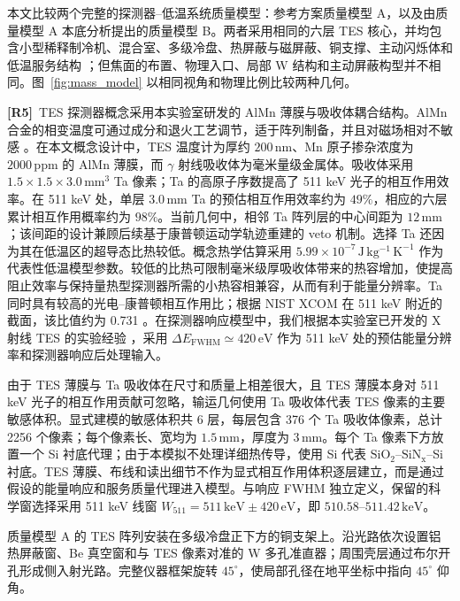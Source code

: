 \documentclass[11pt]{article}
\newcommand{\revmark}[1]{\textcolor{revisionblue}{\textbf{[R#1]}}\ }
\begin{document}
本文比较两个完整的探测器--低温系统质量模型：参考方案质量模型 A，以及由质量模型 A 本底分析提出的质量模型 B。两者采用相同的六层 TES 核心，并均包含小型稀释制冷机、混合室、多级冷盘、热屏蔽与磁屏蔽、铜支撑、主动闪烁体和低温服务结构 \cite{Shirazi2023,Gottardi2021TESReview}；但焦面的布置、物理入口、局部 W 结构和主动屏蔽构型并不相同。图~\ref{fig:mass_model} 以相同视角和物理比例比较两种几何。

\revmark{5}TES 探测器概念采用本实验室研发的 AlMn 薄膜与吸收体耦合结构。AlMn 合金的相变温度可通过成分和退火工艺调节，适于阵列制备，并且对磁场相对不敏感 \cite{Xie2026AlMn,Vavagiakis2017AlMnMagnetic}。在本文概念设计中，TES 温度计为厚约 $200\,\mathrm{nm}$、Mn 原子掺杂浓度为 $2000\,\mathrm{ppm}$ 的 AlMn 薄膜，而 $\gamma$ 射线吸收体为毫米量级金属体。吸收体采用 $1.5\times1.5\times3.0\,\mathrm{mm^3}$ Ta 像素；Ta 的高原子序数提高了 511 keV 光子的相互作用效率。在 511 keV 处，单层 $3.0\,\mathrm{mm}$ Ta 的预估相互作用效率约为 $49\%$，相应的六层累计相互作用概率约为 $98\%$。当前几何中，相邻 Ta 阵列层的中心间距为 $12\,\mathrm{mm}$；该间距的设计兼顾后续基于康普顿运动学轨迹重建的 veto 机制。选择 Ta 还因为其在低温区的超导态比热较低。概念热学估算采用 $5.99\times10^{-7}\,\mathrm{J\,kg^{-1}\,K^{-1}}$ 作为代表性低温模型参数。较低的比热可限制毫米级厚吸收体带来的热容增加，使提高阻止效率与保持量热型探测器所需的小热容相兼容，从而有利于能量分辨率。Ta 同时具有较高的光电--康普顿相互作用比；根据 NIST XCOM 在 511 keV 附近的截面，该比值约为 0.731 \cite{NISTXCOM}。在探测器响应模型中，我们根据本实验室已开发的 X 射线 TES 的实验经验 \cite{Xie2026AlMn}，采用 $\Delta E_{\mathrm{FWHM}}\simeq420\,\mathrm{eV}$ 作为 511 keV 处的预估能量分辨率和探测器响应后处理输入。

由于 TES 薄膜与 Ta 吸收体在尺寸和质量上相差很大，且 TES 薄膜本身对 511 keV 光子的相互作用贡献可忽略，输运几何使用 Ta 吸收体代表 TES 像素的主要敏感体积。显式建模的敏感体积共 6 层，每层包含 376 个 Ta 吸收体像素，总计 2256 个像素；每个像素长、宽均为 $1.5\,\mathrm{mm}$，厚度为 $3\,\mathrm{mm}$。每个 Ta 像素下方放置一个 Si 衬底代理；由于本模拟不处理详细热传导，使用 Si 代表 $\mathrm{SiO_2}$--$\mathrm{SiN_x}$--Si 衬底。TES 薄膜、布线和读出细节不作为显式相互作用体积逐层建立，而是通过假设的能量响应和服务质量代理进入模型。与响应 FWHM 独立定义，保留的科学窗选择采用 511 keV 线窗 $W_{511}=511\,\mathrm{keV}\pm420\,\mathrm{eV}$，即 $510.58$--$511.42\,\mathrm{keV}$。

质量模型 A 的 TES 阵列安装在多级冷盘正下方的铜支架上。沿光路依次设置铝热屏蔽窗、Be 真空窗和与 TES 像素对准的 W 多孔准直器；周围壳层通过布尔开孔形成侧入射光路。完整仪器框架旋转 $45^\circ$，使局部孔径在地平坐标中指向 $45^\circ$ 仰角。
\end{document}
